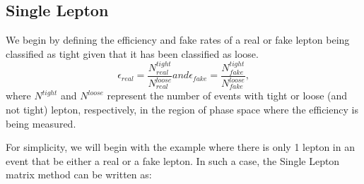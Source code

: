 

\subsection{Single Lepton}

We begin by defining the efficiency and fake rates of a real or fake lepton being classified as tight
given that it has been classified as loose.
\begin{equation}
  \label{eqn:efficiency_fake_rate}
  \epsilon_{real} = \frac{N^{tight}_{real}}{N^{loose}_{real}} and \epsilon_{fake} = \frac{N^{tight}_{fake}}{N^{loose}_{fake}},
\end{equation}
where $N^{tight}$ and $N^{loose}$ represent the number of events with tight or loose (and not tight) lepton, respectively, in the region of phase space where the efficiency is being measured.


For simplicity, we will begin with the example where there is only 1 lepton in an event that be either a real or a fake lepton.
In such a case, the Single Lepton matrix method can be written as:


